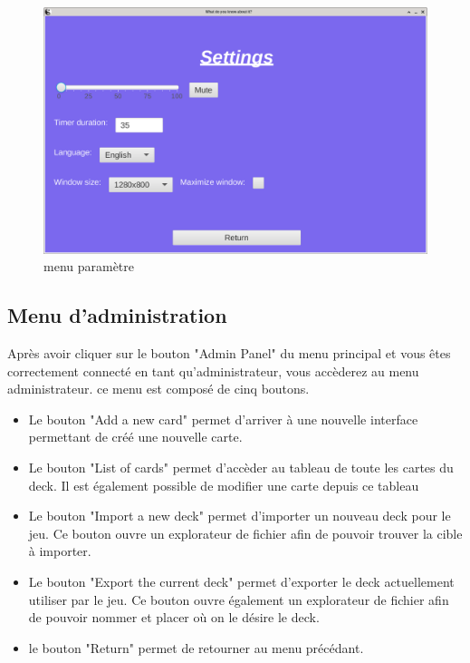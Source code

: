 \begin{figure}[h]
	\centering
	\includegraphics[width=\textwidth]{setting.png}
	\caption{menu paramètre}
	\label{fig:menu_setting}
\end{figure}

\newpage
\subsection{Menu d'administration}
Après avoir cliquer sur le bouton "Admin Panel" du menu principal et vous êtes correctement connecté en tant 
qu'administrateur, vous accèderez au menu administrateur. ce menu est composé de cinq boutons.
\begin{itemize}
	\item Le bouton "Add a new card" permet d'arriver à une nouvelle interface permettant de créé une nouvelle carte.
	\item Le bouton "List of cards" permet d'accèder au tableau de toute les cartes du deck. Il est également possible de modifier une carte depuis ce tableau
	\item Le bouton "Import a new deck" permet d'importer un nouveau deck pour le jeu. Ce bouton ouvre un explorateur de fichier afin de pouvoir trouver la cible à importer.
	\item Le bouton "Export the current deck" permet d'exporter le deck actuellement utiliser par le jeu. Ce bouton ouvre également un explorateur de fichier afin de pouvoir nommer et placer où on le désire le deck.
	\item le bouton "Return" permet de retourner au menu précédant.
\end{itemize}

